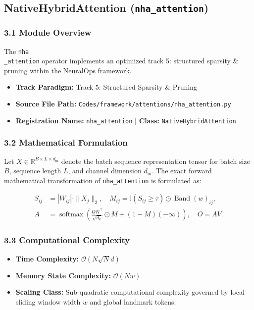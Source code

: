 \subsection{NativeHybridAttention (\texttt{nha\_attention})}
\label{sec:app_module_nha_attention}

\subsubsection*{3.1 Module Overview}
The \texttt{nha\\_attention} operator implements an optimized track 5: structured sparsity \& pruning within the NeuralOps framework.
\begin{itemize}
    \item \textbf{Track Paradigm:} Track 5: Structured Sparsity & Pruning
    \item \textbf{Source File Path:} \texttt{Codes/framework/attentions/nha\_attention.py}
    \item \textbf{Registration Name:} \texttt{nha\_attention} $\mid$ \textbf{Class:} \texttt{NativeHybridAttention}
\end{itemize}

\subsubsection*{3.2 Mathematical Formulation}
Let $X \in \mathbb{R}^{B \times L \times d_{\text{in}}}$ denote the batch sequence representation tensor for batch size $B$, sequence length $L$, and channel dimension $d_{\text{in}}$. The exact forward mathematical transformation of \texttt{nha\_attention} is formulated as:

\begin{align}
S_{ij} &= |W_{ij}| \cdot \|X_j\|_2, \quad M_{ij} = \mathbb{I}(S_{ij} \ge \tau) \odot \operatorname{Band}(w)_{ij}, \\
A &= \operatorname{softmax}\left(\frac{Q K^\top}{\sqrt{d_k}} \odot M + (1 - M)(-\infty)\right), \quad O = A V.
\end{align}


\subsubsection*{3.3 Computational Complexity}
\begin{itemize}
    \item \textbf{Time Complexity:} $\mathcal{O}(N \sqrt{N} d)$
    \item \textbf{Memory State Complexity:} $\mathcal{O}(N w)$
    \item \textbf{Scaling Class:} Sub-quadratic computational complexity governed by local sliding window width $w$ and global landmark tokens.
\end{itemize}

